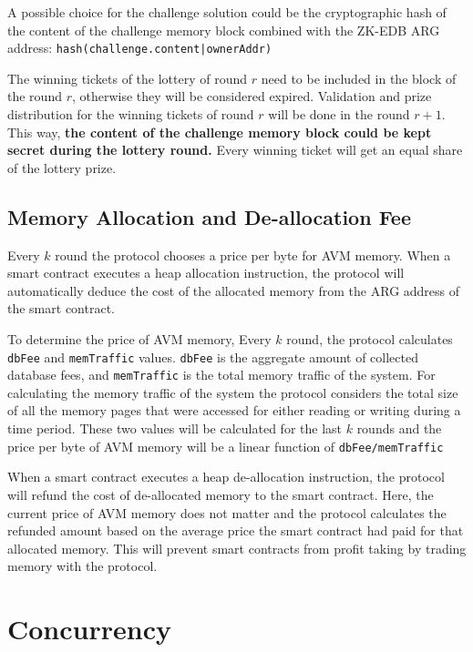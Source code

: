 \documentclass[a4paper]{report}
\begin{document}
    A possible choice for the challenge solution could be the cryptographic hash of the content of the challenge
    memory block combined with the ZK-EDB ARG address: \texttt{hash(challenge.content|ownerAddr)}

    The winning tickets of the lottery of round \(r\) need to be included in the block of the round \(r\),
    otherwise they will be considered expired. Validation and prize distribution for the winning tickets of round
    \(r\) will be done in the round \(r + 1\). This way, \textbf{the content of the challenge memory block could be
    kept secret during the lottery round.} Every winning ticket will get an equal share of the lottery prize.

    \subsection{Memory Allocation and De-allocation Fee}\label{subsec:memory-allocation-and-de-allocation}

    Every \(k\) round the protocol chooses a price per byte for AVM memory. When a smart contract executes a heap
    allocation instruction, the protocol will automatically deduce the cost of the allocated memory from the ARG
    address of the smart contract.

    To determine the price of AVM memory, Every \(k\) round, the protocol calculates \texttt{dbFee} and
    \texttt{memTraffic} values. \texttt{dbFee} is the aggregate amount of collected database fees, and
    \texttt{memTraffic} is the total memory traffic of the system. For calculating the memory traffic of the system
    the protocol considers the total size of all the memory pages that were accessed for either reading or writing
    during a time period. These two values will be calculated for the last \(k\) rounds and the price per byte of
    AVM memory will be a linear function of \texttt{dbFee/memTraffic}

    When a smart contract executes a heap de-allocation instruction, the protocol will refund the cost of
    de-allocated memory to the smart contract. Here, the current price of AVM memory does not matter and the protocol
    calculates the refunded amount based on the average price the smart contract had paid for that allocated memory.
    This will prevent smart contracts from profit taking by trading memory with the protocol.


    \section{Concurrency}\label{sec:concurrency}
\end{document}
